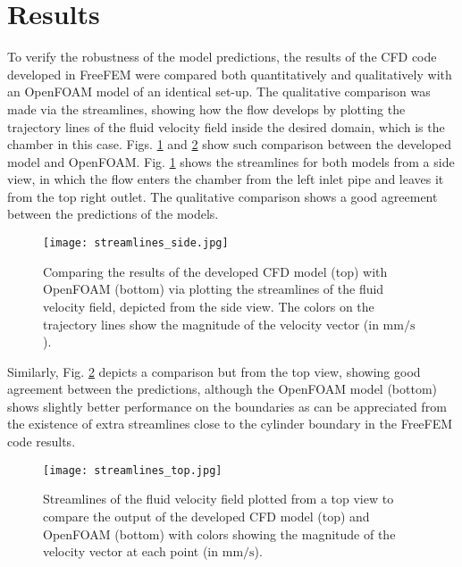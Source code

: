 \section{Results}

To verify the robustness of the model predictions, the results of the {CFD} code developed in FreeFEM were compared both quantitatively and qualitatively with an OpenFOAM model of an identical set-up. The qualitative comparison was made via the streamlines, showing how the flow develops by plotting the trajectory lines of the fluid velocity field inside the desired domain, which is the chamber in this case. Figs. \ref{fig:fluid_streamlines_side} and \ref{fig:fluid_streamlines_top} show such comparison between the developed model and OpenFOAM. Fig. \ref{fig:fluid_streamlines_side} shows the streamlines for both models from a side view, in which the flow enters the chamber from the left inlet pipe and leaves it from the top right outlet. The qualitative comparison shows a good agreement between the predictions of the models.

\begin{figure}[h]
\centering
\medskip
\texttt{[image: streamlines\_side.jpg]}
\caption[Comparing streamline results of developed CFD code and OpenFOAM - side view]{Comparing the results of the developed {CFD} model (top) with OpenFOAM (bottom) via plotting the streamlines of the fluid velocity field, depicted from the side view. The colors on the trajectory lines show the magnitude of the velocity vector (in $\mathrm{mm}/\mathrm{s}$).} \label{fig:fluid_streamlines_side}
\end{figure}

Similarly, Fig. \ref{fig:fluid_streamlines_top} depicts a comparison but from the top view, showing good agreement between the predictions, although the OpenFOAM model (bottom) shows slightly better performance on the boundaries as can be appreciated from the existence of extra streamlines close to the cylinder boundary in the FreeFEM code results.

\begin{figure}[h]
\centering
\medskip
\texttt{[image: streamlines\_top.jpg]}
\caption[Comparing streamline results of developed CFD code and OpenFOAM - top view]{Streamlines of the fluid velocity field plotted from a top view to compare the output of the developed {CFD} model (top) and OpenFOAM (bottom)  with colors showing the magnitude of the velocity vector at each point (in $\mathrm{mm}/\mathrm{s}$).} \label{fig:fluid_streamlines_top}
\end{figure}

